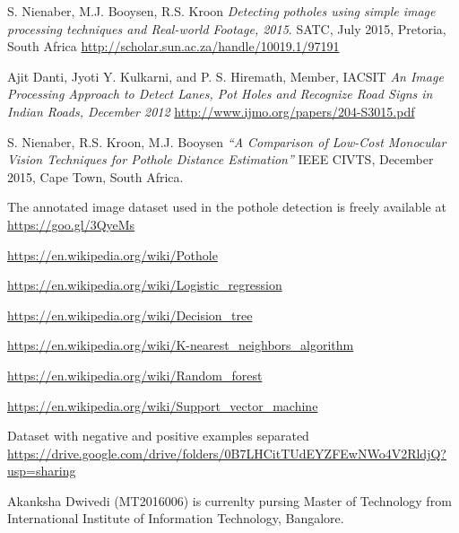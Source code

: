 \documentclass[journal]{IEEEtran}
\begin{document}
\begin{thebibliography}{1}

S. Nienaber, M.J. Booysen, R.S. Kroon
\textit{Detecting potholes using simple image processing techniques and Real-world Footage, 2015}. 
SATC, July 2015, Pretoria, South Africa
\url{http://scholar.sun.ac.za/handle/10019.1/97191}
 
Ajit Danti, Jyoti Y. Kulkarni, and P. S. Hiremath, Member, IACSIT
\textit{An Image Processing Approach to Detect Lanes, Pot Holes and Recognize Road Signs in Indian Roads, December 2012}
\url{http://www.ijmo.org/papers/204-S3015.pdf}

S. Nienaber, R.S. Kroon, M.J. Booysen  
\textit{“A Comparison of Low-Cost Monocular Vision Techniques for Pothole Distance Estimation”}
IEEE CIVTS, December 2015, Cape Town, South Africa.
 
The annotated image dataset used in the pothole detection is freely available at
\url{https://goo.gl/3QyeMs}

\url{https://en.wikipedia.org/wiki/Pothole}

\url{https://en.wikipedia.org/wiki/Logistic_regression}

\url{https://en.wikipedia.org/wiki/Decision_tree}

\url{https://en.wikipedia.org/wiki/K-nearest_neighbors_algorithm}

\url{https://en.wikipedia.org/wiki/Random_forest}

\url{https://en.wikipedia.org/wiki/Support_vector_machine}

Dataset with negative and positive examples separated
\url{https://drive.google.com/drive/folders/0B7LHCitTUdEYZFEwNWo4V2RldjQ?usp=sharing}

\end{thebibliography}

\begin{IEEEbiography}{Akanksha Dwivedi}
(MT2016006) is currenlty pursing Master of Technology from International Institute of Information Technology, Bangalore. 
\end{IEEEbiography}
\end{document}
